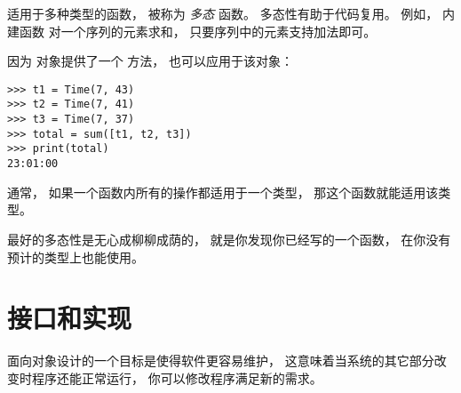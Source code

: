 适用于多种类型的函数， 被称为 {\em 多态} 函数。
多态性有助于代码复用。  例如， 内建函数  对一个序列的元素求和， 只要序列中的元素支持加法即可。



因为  对象提供了一个  方法，  也可以应用于该对象：

\begin{lstlisting}
>>> t1 = Time(7, 43)
>>> t2 = Time(7, 41)
>>> t3 = Time(7, 37)
>>> total = sum([t1, t2, t3])
>>> print(total)
23:01:00
\end{lstlisting}

%

通常， 如果一个函数内所有的操作都适用于一个类型， 那这个函数就能适用该类型。


最好的多态性是无心成柳柳成荫的， 就是你发现你已经写的一个函数，
在你没有预计的类型上也能使用。




\section{接口和实现}


面向对象设计的一个目标是使得软件更容易维护，
这意味着当系统的其它部分改变时程序还能正常运行， 你可以修改程序满足新的需求。
  
  


